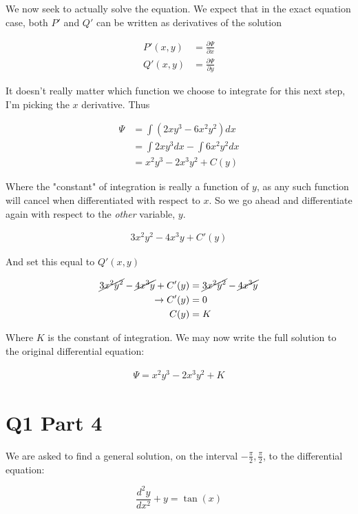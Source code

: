 \documentclass[paper=a4, fontsize=11pt]{scrartcl} %
\numberwithin{equation}{section} %
\numberwithin{figure}{section} %
\numberwithin{table}{section} %
\begin{document}
\hspace{2mm}
We now seek to actually solve the equation. We expect that in the exact equation case, both $P'$ and $Q'$ can be written as derivatives of the solution 

\begin{align}
P'(x,y) &= \frac{\partial \Psi}{\partial x} \\
Q'(x,y) &= \frac{\partial \Psi}{\partial y} 
\end{align}

It doesn't really matter which function we choose to integrate for this next step, I'm picking the $x$ derivative. Thus 

\begin{align}
\Psi &= \int \left( 2 x y^3 - 6 x^2 y^2 \right)dx \\
&= \int 2xy^3 dx - \int 6x^2 y^2 dx \\
&= x^2 y^3 - 2x^3 y^2 + C(y)
\end{align}

Where the "constant" of integration is really a function of $y$, as any such function will cancel when differentiated with respect to $x$. So we go ahead and differentiate again with respect to the \textit{other} variable, $y$.

\begin{align}
3x^2 y^2 - 4 x^3 y + C'(y)
\end{align}

And set this equal to $Q'(x,y)$

\begin{align}
\cancel{3x^2 y^2} - \cancel{4x^3 y} + C'(y) &= \cancel{3x^2 y^2}- \cancel{4 x^3 y} \\
\rightarrow C'(y) &= 0 \\
C(y) &= K
\end{align}

Where $K$ is the constant of integration. We may now write the full solution to the original differential equation:

\begin{align}
\Psi = x^2 y^3 - 2 x^3 y^2 + K
\end{align}

\section{Q1 Part 4}
We are asked to find a general solution, on the interval $-\frac{\pi}{2}, \frac{\pi}{2}$, to the differential equation:

\begin{equation}
\frac{d^2 y}{dx^2} + y = \tan(x)
\end{equation}
\end{document}
